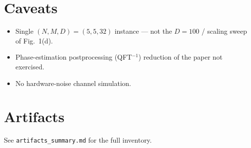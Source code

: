 \documentclass[11pt]{article}
\begin{document}
\section{Caveats}
\begin{itemize}
\item Single $(N,M,D) = (5,5,32)$ instance --- not the $D=100$ / scaling sweep of Fig.~1(d).
\item Phase-estimation postprocessing (QFT$^{-1}$) reduction of the paper not exercised.
\item No hardware-noise channel simulation.
\end{itemize}



\section*{Artifacts}
See \texttt{artifacts\_summary.md} for the full inventory.
\end{document}
